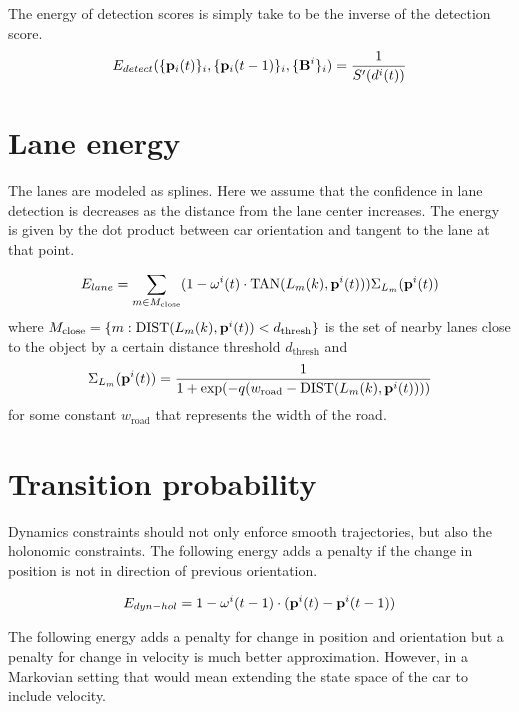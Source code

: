 The energy of detection scores is simply take to be the inverse of the detection score.
\begin{align}
  E_{detect}(\{ \mathbf{p}_{i}({t}) \}_i, \{ \mathbf{p}_{i}({t-1}) \}_i, \{\mathbf{B}^{i}\}_i ) = \frac{1}{S'(d^{i}(t))}
\end{align}

\section{Lane energy}
\label{sec:laneEnergy}
 The lanes are modeled as splines. Here we assume that the confidence in lane
 detection is decreases as the distance from the lane center increases.  The
 energy is given by the dot product between car orientation and tangent to the
 lane at that point.

\begin{align}
  \label{eq:laneOrientationEnergy}
  E_{lane} = 
  \sum_{m \in M_{\text{close}}}
  (1 - \mathbf{\omega}^{i}(t) \cdot \text{TAN}(L_{m}(k), \mathbf{p}^{i}({t})) )
\Sigma_{L_m}(\mathbf{p}^{i}({t}))
\end{align}
where $M_{\text{close}} = \{m : \text{DIST}(L_{m}(k), \mathbf{p}^{i}({t})) < d_{\text{thresh}}\} $ is
the set of nearby lanes close to the object by a certain distance threshold $d_{\text{thresh}}$ and 
\begin{align}
\Sigma_{L_m}(\mathbf{p}^{i}({t})) = 
  \frac{1}{1 + \exp(-q(w_{\text{road}} - \text{DIST}(L_{m}(k), \mathbf{p}^{i}({t}))))}
\end{align}
for some constant $w_{\text{road}}$ that represents the width of the road.

\section{Transition probability}
Dynamics constraints should not only enforce smooth trajectories, but also the
holonomic constraints.  The following energy adds a penalty if the change in
position is not in direction of previous orientation.

\begin{align}
  \label{eq:totalPosTransitionEnergy}
  E_{dyn-hol} = 1 - \mathbf{\omega}^{i}(t-1) \cdot (\mathbf{p}^{i}({t}) - \mathbf{p}^{i}({t-1}))
\end{align}

The following energy adds a penalty for change in position and orientation
but a penalty for change in velocity is much better approximation. However, in
a Markovian setting that would mean extending the state space of the car to
include velocity.

